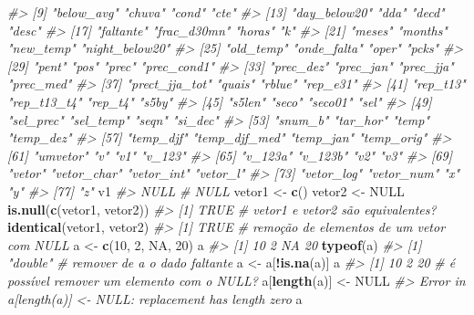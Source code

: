 \documentclass[]{book}
\newenvironment{Shaded}{\begin{snugshade}}{\end{snugshade}}
\newcommand{\KeywordTok}[1]{\textcolor[rgb]{0.13,0.29,0.53}{\textbf{#1}}}
\newcommand{\DecValTok}[1]{\textcolor[rgb]{0.00,0.00,0.81}{#1}}
\newcommand{\StringTok}[1]{\textcolor[rgb]{0.31,0.60,0.02}{#1}}
\newcommand{\CommentTok}[1]{\textcolor[rgb]{0.56,0.35,0.01}{\textit{#1}}}
\newcommand{\OtherTok}[1]{\textcolor[rgb]{0.56,0.35,0.01}{#1}}
\newcommand{\OperatorTok}[1]{\textcolor[rgb]{0.81,0.36,0.00}{\textbf{#1}}}
\newcommand{\NormalTok}[1]{#1}
\begin{document}
\begin{Shaded}
\begin{Highlighting}[]
\CommentTok{#>  [9] "below_avg"     "chuva"         "cond"          "cte"          }
\CommentTok{#> [13] "day_below20"   "dda"           "decd"          "desc"         }
\CommentTok{#> [17] "faltante"      "frac_d30mn"    "horas"         "k"            }
\CommentTok{#> [21] "meses"         "months"        "new_temp"      "night_below20"}
\CommentTok{#> [25] "old_temp"      "onde_falta"    "oper"          "pcks"         }
\CommentTok{#> [29] "pent"          "pos"           "prec"          "prec_cond1"   }
\CommentTok{#> [33] "prec_dez"      "prec_jan"      "prec_jja"      "prec_med"     }
\CommentTok{#> [37] "prect_jja_tot" "quais"         "rblue"         "rep_e31"      }
\CommentTok{#> [41] "rep_t13"       "rep_t13_t4"    "rep_t4"        "s5by"         }
\CommentTok{#> [45] "s5len"         "seco"          "seco01"        "sel"          }
\CommentTok{#> [49] "sel_prec"      "sel_temp"      "seqn"          "si_dec"       }
\CommentTok{#> [53] "snum_b"        "tar_hor"       "temp"          "temp_dez"     }
\CommentTok{#> [57] "temp_djf"      "temp_djf_med"  "temp_jan"      "temp_orig"    }
\CommentTok{#> [61] "umvetor"       "v"             "v1"            "v_123"        }
\CommentTok{#> [65] "v_123a"        "v_123b"        "v2"            "v3"           }
\CommentTok{#> [69] "vetor"         "vetor_char"    "vetor_int"     "vetor_l"      }
\CommentTok{#> [73] "vetor_log"     "vetor_num"     "x"             "y"            }
\CommentTok{#> [77] "z"}
\NormalTok{v1}
\CommentTok{#> NULL}
\CommentTok{# NULL}
\NormalTok{vetor1 <-}\StringTok{ }\KeywordTok{c}\NormalTok{()}
\NormalTok{vetor2 <-}\StringTok{ }\OtherTok{NULL}
\KeywordTok{is.null}\NormalTok{(}\KeywordTok{c}\NormalTok{(vetor1, vetor2))}
\CommentTok{#> [1] TRUE}
\CommentTok{# vetor1 e vetor2 são equivalentes?}
\KeywordTok{identical}\NormalTok{(vetor1, vetor2)}
\CommentTok{#> [1] TRUE}
\CommentTok{# remoção de elementos de um vetor com NULL}
\NormalTok{a <-}\StringTok{ }\KeywordTok{c}\NormalTok{(}\DecValTok{10}\NormalTok{, }\DecValTok{2}\NormalTok{, }\OtherTok{NA}\NormalTok{, }\DecValTok{20}\NormalTok{)}
\NormalTok{a}
\CommentTok{#> [1] 10  2 NA 20}
\KeywordTok{typeof}\NormalTok{(a)}
\CommentTok{#> [1] "double"}
\CommentTok{# remover de a o dado faltante}
\NormalTok{a <-}\StringTok{ }\NormalTok{a[}\OperatorTok{!}\KeywordTok{is.na}\NormalTok{(a)]}
\NormalTok{a}
\CommentTok{#> [1] 10  2 20}
\CommentTok{# é possível remover um elemento com o NULL?}
\NormalTok{a[}\KeywordTok{length}\NormalTok{(a)] <-}\StringTok{ }\OtherTok{NULL}
\CommentTok{#> Error in a[length(a)] <- NULL: replacement has length zero}
\NormalTok{a}

\end{Highlighting}
\end{Shaded}
\end{document}
